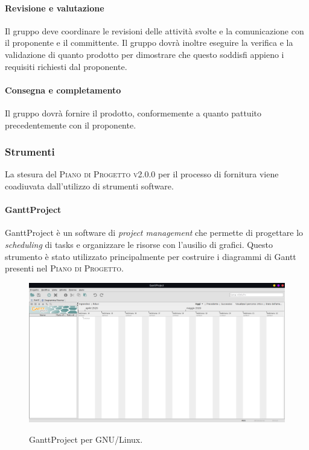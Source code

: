 \documentclass[../norme-di-progetto.tex]{subfiles}
\begin{document}
\paragraph{Revisione e valutazione}
Il gruppo deve coordinare le revisioni delle attività svolte e la comunicazione con il proponente e il committente. Il gruppo dovrà inoltre eseguire la verifica e la validazione di quanto prodotto per dimostrare che questo soddisfi appieno i requisiti richiesti dal proponente.

\paragraph{Consegna e completamento}
Il gruppo dovrà fornire il prodotto, conformemente a quanto pattuito precedentemente con il proponente.

\subsubsection{Strumenti}
La stesura del \textsc{Piano di Progetto v2.0.0} per il processo di fornitura viene coadiuvata dall'utilizzo di strumenti software.

\paragraph{GanttProject}
GanttProject è un software di \textit{project management} che permette di progettare lo \textit{scheduling} di tasks e organizzare le risorse con l'ausilio di grafici. Questo strumento è stato utilizzato principalmente per costruire i diagrammi di Gantt presenti nel \textsc{Piano di Progetto}.

\begin{figure}[H]
  \centering
  \includegraphics[width=15cm]{img/gantt.png}
  \label{fig:gantt}
  \caption{GanttProject per GNU/Linux.}
\end{figure}
\end{document}
